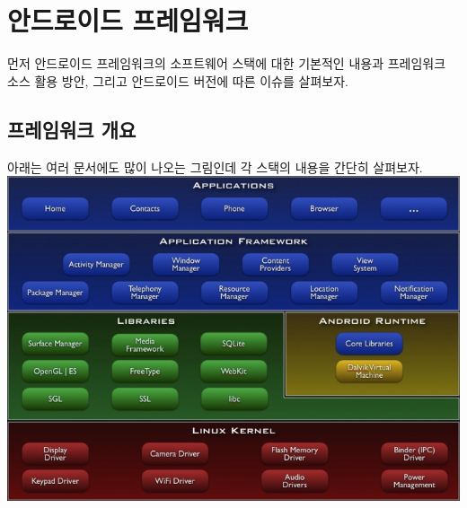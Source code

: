 \chapter{안드로이드 프레임워크}
먼저 안드로이드 프레임워크의 소프트웨어 스택에 대한 기본적인 내용과 프레임워크 소스 활용 방안, 그리고 안드로이드 버전에 따른 이슈를 살펴보자.

\section{프레임워크 개요}
아래는 여러 문서에도 많이 나오는 그림인데 각 스택의 내용을 간단히 살펴보자.\\

\includegraphics[scale=0.65]{system-architecture}
